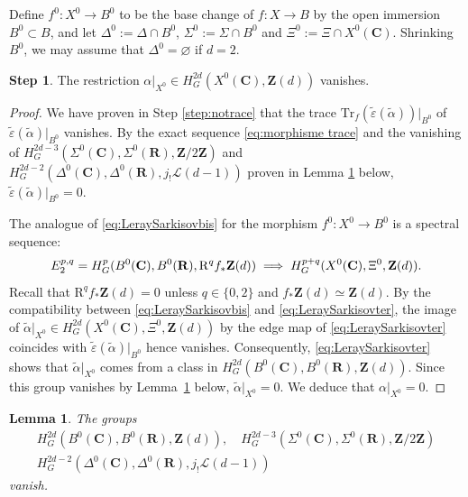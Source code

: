 \documentclass[JEP,XML,SOM,Unicode]{cedram}
\newcommand\implique{\mathchoice{\implies}{\Rightarrow}{\Rightarrow}{\Rightarrow}}
\theoremstyle{plain}
\newtheorem{lem}[thm]{Lemma}
\theoremstyle{definition}
\newtheorem{Step}{Step}
\numberwithin{equation}{section}
\renewcommand{\C}{{\mathbf C}}
\newcommand{\R}{{\mathbf R}}
\newcommand{\Z}{{\mathbf Z}}
\newcommand{\Trf}{\mathrm{Tr}_f}
\renewcommand{\emptyset}{\varnothing}
\newcommand{\RR}{{\mathrm{R}}}
\begin{document}
Define $f^0:X^0\to B^0$ to be the base change of $f:X\to B$ by the open immersion $B^0\subset B$, and let $\Delta^0:=\Delta\cap B^0$, $\Sigma^0:=\Sigma\cap B^0$ and $\Xi^0:=\Xi\cap X^0(\C)$.
Shrinking $B^0$, we may assume that $\Delta^0=\emptyset$ if $d=2$.

\begin{Step}
\label{step:killonopen}
The restriction $\alpha|_{X^0} \in H^{2d}_G(X^0(\C),\Z(d))$ vanishes.
\end{Step}

\begin{proof}
We have proven in Step \ref{step:notrace} that the trace $\Trf(\tilde{\varepsilon}(\tilde{\alpha}))|_{B^0}$ of $\tilde{\varepsilon}(\tilde{\alpha})|_{B^0}$ vanishes. By the exact sequence \eqref{eq:morphisme trace} and the vanishing of $H^{2d-3}_G(\Sigma^0(\C),\Sigma^0(\R), \Z/2\Z)$ and $H^{2d-2}_G(\Delta^0(\C),\Delta^0(\R), j_!\mathscr{L}(d-1))$ proven in Lemma \ref{lem:relativevanishing} below, $\tilde{\varepsilon}(\tilde{\alpha})|_{B^0}=0$.

The analogue of \eqref{eq:LeraySarkisovbis} for the morphism $f^0:X^0\to B^0$ is a spectral sequence:
\begin{equation}
\label{eq:LeraySarkisovter}
E_2^{p,q}=H^p_G(B^0(\C),B^0(\R),\RR^qf_{*}\Z(d))\implique H_G^{p+q}(X^0(\C),\Xi^0,\Z(d)).
\end{equation}
Recall that $\RR^qf_{*}\Z(d)=0$ unless $q\in\{0,2\}$ and $f_*\Z(d)\simeq\Z(d)$.
By the compatibility between \eqref{eq:LeraySarkisovbis} and \eqref{eq:LeraySarkisovter}, the image of $\tilde{\alpha}|_{X^0}\in H_G^{2d}(X^0(\C),\Xi^0,\Z(d))$ by the edge map of \eqref{eq:LeraySarkisovter} coincides with $\tilde{\varepsilon}(\tilde{\alpha})|_{B^0}$ hence vanishes.
Consequently, \eqref{eq:LeraySarkisovter} shows that $\tilde{\alpha}|_{X^0}$ comes from a class in $H^{2d}_G(B^0(\C),B^0(\R),\Z(d))$. Since this group vanishes by Lemma~\ref{lem:relativevanishing} below, $\tilde{\alpha}|_{X^0}=0$. We deduce that $\alpha|_{X^0}=0$.
\end{proof}

\begin{lem}
\label{lem:relativevanishing}
The groups
\begin{gather*}
H^{2d}_G(B^0(\C),B^0(\R),\Z(d)),\quad H^{2d-3}_G(\Sigma^0(\C),\Sigma^0(\R), \Z/2\Z)\\
\tag*{and} H^{2d-2}_G(\Delta^0(\C),\Delta^0(\R), j_!\mathscr{L}(d-1))
\end{gather*}
vanish.
\end{lem}
\end{document}
